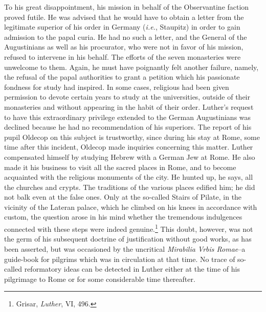 To his great disappointment, his mission in behalf of the Observantine
faction proved futile. He was advised that he would have to
obtain a letter from the legitimate superior of his order in Germany
(\textit{i.e.}, Staupitz) in order to gain admission to the papal curia. He
had no such a letter, and the General of the Augustinians as well
as his procurator, who were not in favor of his mission, refused to
intervene in his behalf. The efforts of the seven monasteries were
unwelcome to them. Again, he must have poignantly felt another
failure, namely, the refusal of the papal authorities to grant a petition
which his passionate fondness for study had inspired. In some cases,
religious had been given permission to devote certain years to study
at the universities, outside of their monasteries and without appearing
in the habit of their order. Luther’s request to have this extraordinary
privilege extended to the German Augustinians was declined
because he had no recommendation of his superiors. The report of his
pupil Oldecop on this subject is trustworthy, since during his stay at
Rome, some time after this incident, Oldecop made inquiries concerning
this matter. Luther compensated himself by studying Hebrew
with a German Jew at Rome. He also made it his business to visit
all the sacred places in Rome, and to become acquainted with the
religious monuments of the city. He hunted up, he says, all the
churches and crypts. The traditions of the various places edified
him; he did not balk even at the false ones. Only at the so-called
Stairs of Pilate, in the vicinity of the Lateran palace, which he
climbed on his knees in accordance with custom, the question arose
in his mind whether the tremendous indulgences connected with
these steps were indeed genuine.\footnote{Grisar, \textit{Luther}, VI, 496.}
This doubt, however, was not the
germ of his subsequent doctrine of justification without good works,
as has been asserted, but was occasioned by the uncritical \textit{Mirabilia
Vrbis Romae}--a guide-book for pilgrims which was in circulation at
that time. No trace of so-called reformatory ideas can be detected in
Luther either at the time of his pilgrimage to Rome or for some
considerable time thereafter.

